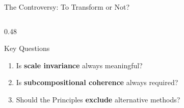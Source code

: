 \begin{frame}{The Controversy: To Transform or Not?}
\begin{columns}[T]
\begin{column}{0.48\textwidth}
    \vspace{0.3cm}
    \begin{block}{Key Questions}
      \begin{enumerate}
        \item Is \textbf{scale invariance} always meaningful?
        \item Is \textbf{subcompositional coherence} always required?
        \item Should the Principles \textbf{exclude} alternative methods?
      \end{enumerate}
    \end{block}
  \end{column}
\end{columns}

\end{frame}

